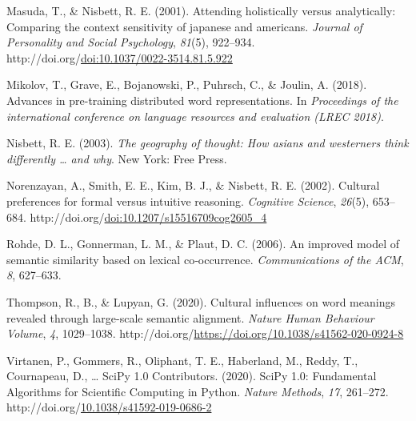 \documentclass[10pt, letterpaper]{article}
\newenvironment{CSLReferences}%
  {}%
  {\par}
\begin{document}
\begin{CSLReferences}{1}{0}
\leavevmode{}%
Masuda, T., \& Nisbett, R. E. (2001). Attending holistically versus
analytically: Comparing the context sensitivity of japanese and
americans. \emph{Journal of Personality and Social Psychology},
\emph{81}(5), 922--934.
http://doi.org/\href{https://doi.org/doi:10.1037/0022-3514.81.5.922}{doi:10.1037/0022-3514.81.5.922}

\leavevmode{}%
Mikolov, T., Grave, E., Bojanowski, P., Puhrsch, C., \& Joulin, A.
(2018). Advances in pre-training distributed word representations. In
\emph{Proceedings of the international conference on language resources
and evaluation (LREC 2018)}.

\leavevmode{}%
Nisbett, R. E. (2003). \emph{The geography of thought: How asians and
westerners think differently \ldots{} and why}. New York: Free Press.

\leavevmode{}%
Norenzayan, A., Smith, E. E., Kim, B. J., \& Nisbett, R. E. (2002).
Cultural preferences for formal versus intuitive reasoning.
\emph{Cognitive Science}, \emph{26}(5), 653--684.
http://doi.org/\href{https://doi.org/doi:10.1207/s15516709cog2605_4}{doi:10.1207/s15516709cog2605\_4}

\leavevmode{}%
Rohde, D. L., Gonnerman, L. M., \& Plaut, D. C. (2006). An improved
model of semantic similarity based on lexical co‐occurrence.
\emph{Communications of the ACM}, \emph{8}, 627--633.

\leavevmode{}%
Thompson, R., B., \& Lupyan, G. (2020). Cultural influences on word
meanings revealed through large-scale semantic alignment. \emph{Nature
Human Behaviour Volume}, \emph{4}, 1029--1038.
http://doi.org/\url{https://doi.org/10.1038/s41562-020-0924-8}

\leavevmode{}%
Virtanen, P., Gommers, R., Oliphant, T. E., Haberland, M., Reddy, T.,
Cournapeau, D., \ldots{} SciPy 1.0 Contributors. (2020). {{SciPy} 1.0:
Fundamental Algorithms for Scientific Computing in Python}. \emph{Nature
Methods}, \emph{17}, 261--272.
http://doi.org/\href{https://doi.org/10.1038/s41592-019-0686-2}{10.1038/s41592-019-0686-2}

\end{CSLReferences}


\end{document}
